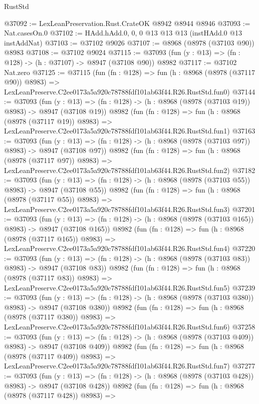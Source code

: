 \begin{lexlean}{RustStd}
\begin{coremodule}
@37092 := LexLeanPreservation.Rust.CrateOK @8942 @8944 @8946
@37093 := Nat.casesOn.{0}
@37102 := HAdd.hAdd.{0, 0, 0} @13 @13 @13 (instHAdd.{0} @13 instAddNat)
@37103 := @37102 @9026
@37107 := @8968 (@8978 (@37103 @90)) @8983
@37108 := @37102 @9024
@37115 := @37093 (fun (y : @13) => (fn : @128) -> (h : @37107) -> @8947 (@37108 @90)) @8982
@37117 := @37102 Nat.zero
@37125 := @37115
    (fun (fn : @128) =>
    fun (h : @8968 (@8978 (@37117 @90)) @8983) =>
    LexLeanPreserve.C2ee0173a5a920c78788fdf101ab63f44.R26.RustStd.fun0)
@37144 := @37093
    (fun (y : @13) => (fn : @128) -> (h : @8968 (@8978 (@37103 @19)) @8983) -> @8947 (@37108 @19))
    @8982
    (fun (fn : @128) =>
    fun (h : @8968 (@8978 (@37117 @19)) @8983) =>
    LexLeanPreserve.C2ee0173a5a920c78788fdf101ab63f44.R26.RustStd.fun1)
@37163 := @37093
    (fun (y : @13) => (fn : @128) -> (h : @8968 (@8978 (@37103 @97)) @8983) -> @8947 (@37108 @97))
    @8982
    (fun (fn : @128) =>
    fun (h : @8968 (@8978 (@37117 @97)) @8983) =>
    LexLeanPreserve.C2ee0173a5a920c78788fdf101ab63f44.R26.RustStd.fun2)
@37182 := @37093
    (fun (y : @13) => (fn : @128) -> (h : @8968 (@8978 (@37103 @55)) @8983) -> @8947 (@37108 @55))
    @8982
    (fun (fn : @128) =>
    fun (h : @8968 (@8978 (@37117 @55)) @8983) =>
    LexLeanPreserve.C2ee0173a5a920c78788fdf101ab63f44.R26.RustStd.fun3)
@37201 := @37093
    (fun (y : @13) => (fn : @128) -> (h : @8968 (@8978 (@37103 @165)) @8983) -> @8947 (@37108 @165))
    @8982
    (fun (fn : @128) =>
    fun (h : @8968 (@8978 (@37117 @165)) @8983) =>
    LexLeanPreserve.C2ee0173a5a920c78788fdf101ab63f44.R26.RustStd.fun4)
@37220 := @37093
    (fun (y : @13) => (fn : @128) -> (h : @8968 (@8978 (@37103 @83)) @8983) -> @8947 (@37108 @83))
    @8982
    (fun (fn : @128) =>
    fun (h : @8968 (@8978 (@37117 @83)) @8983) =>
    LexLeanPreserve.C2ee0173a5a920c78788fdf101ab63f44.R26.RustStd.fun5)
@37239 := @37093
    (fun (y : @13) => (fn : @128) -> (h : @8968 (@8978 (@37103 @380)) @8983) -> @8947 (@37108 @380))
    @8982
    (fun (fn : @128) =>
    fun (h : @8968 (@8978 (@37117 @380)) @8983) =>
    LexLeanPreserve.C2ee0173a5a920c78788fdf101ab63f44.R26.RustStd.fun6)
@37258 := @37093
    (fun (y : @13) => (fn : @128) -> (h : @8968 (@8978 (@37103 @409)) @8983) -> @8947 (@37108 @409))
    @8982
    (fun (fn : @128) =>
    fun (h : @8968 (@8978 (@37117 @409)) @8983) =>
    LexLeanPreserve.C2ee0173a5a920c78788fdf101ab63f44.R26.RustStd.fun7)
@37277 := @37093
    (fun (y : @13) => (fn : @128) -> (h : @8968 (@8978 (@37103 @428)) @8983) -> @8947 (@37108 @428))
    @8982
    (fun (fn : @128) =>
    fun (h : @8968 (@8978 (@37117 @428)) @8983) =>

\end{coremodule}
\end{lexlean}
